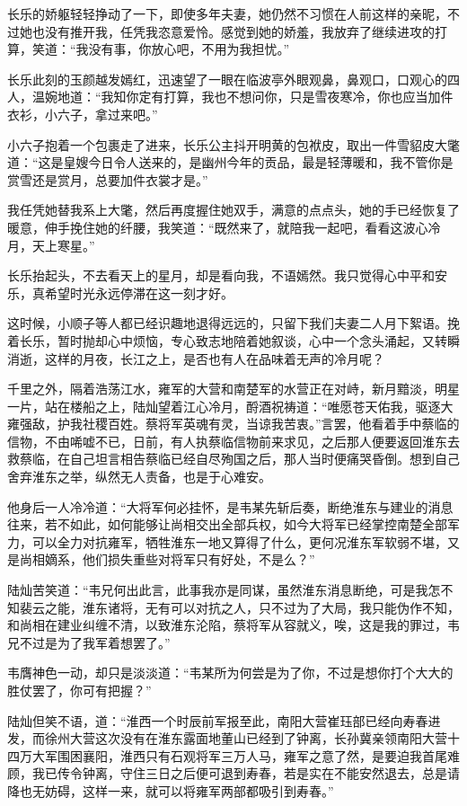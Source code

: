 长乐的娇躯轻轻挣动了一下，即使多年夫妻，她仍然不习惯在人前这样的亲昵，不过她也没有推开我，任凭我恣意爱怜。感觉到她的娇羞，我放弃了继续进攻的打算，笑道：“我没有事，你放心吧，不用为我担忧。”

长乐此刻的玉颜越发嫣红，迅速望了一眼在临波亭外眼观鼻，鼻观口，口观心的四人，温婉地道：“我知你定有打算，我也不想问你，只是雪夜寒冷，你也应当加件衣衫，小六子，拿过来吧。”

小六子抱着一个包裹走了进来，长乐公主抖开明黄的包袱皮，取出一件雪貂皮大氅道：“这是皇嫂今日令人送来的，是幽州今年的贡品，最是轻薄暖和，我不管你是赏雪还是赏月，总要加件衣裳才是。”

我任凭她替我系上大氅，然后再度握住她双手，满意的点点头，她的手已经恢复了暖意，伸手挽住她的纤腰，我笑道：“既然来了，就陪我一起吧，看看这波心冷月，天上寒星。”

长乐抬起头，不去看天上的星月，却是看向我，不语嫣然。我只觉得心中平和安乐，真希望时光永远停滞在这一刻才好。

这时候，小顺子等人都已经识趣地退得远远的，只留下我们夫妻二人月下絮语。挽着长乐，暂时抛却心中烦恼，专心致志地陪着她叙谈，心中一个念头涌起，又转瞬消逝，这样的月夜，长江之上，是否也有人在品味着无声的冷月呢？

千里之外，隔着浩荡江水，雍军的大营和南楚军的水营正在对峙，新月黯淡，明星一片，站在楼船之上，陆灿望着江心冷月，酹酒祝祷道：“唯愿苍天佑我，驱逐大雍强敌，护我社稷百姓。蔡将军英魂有灵，当谅我苦衷。”言罢，他看着手中蔡临的信物，不由唏嘘不已，日前，有人执蔡临信物前来求见，之后那人便要返回淮东去救蔡临，在自己坦言相告蔡临已经自尽殉国之后，那人当时便痛哭昏倒。想到自己舍弃淮东之举，纵然无人责备，也是于心难安。

他身后一人冷冷道：“大将军何必挂怀，是韦某先斩后奏，断绝淮东与建业的消息往来，若不如此，如何能够让尚相交出全部兵权，如今大将军已经掌控南楚全部军力，可以全力对抗雍军，牺牲淮东一地又算得了什么，更何况淮东军软弱不堪，又是尚相嫡系，他们损失重些对将军只有好处，不是么？”

陆灿苦笑道：“韦兄何出此言，此事我亦是同谋，虽然淮东消息断绝，可是我怎不知裴云之能，淮东诸将，无有可以对抗之人，只不过为了大局，我只能伪作不知，和尚相在建业纠缠不清，以致淮东沦陷，蔡将军从容就义，唉，这是我的罪过，韦兄不过是为了我军着想罢了。”

韦膺神色一动，却只是淡淡道：“韦某所为何尝是为了你，不过是想你打个大大的胜仗罢了，你可有把握？”

陆灿但笑不语，道：“淮西一个时辰前军报至此，南阳大营崔珏部已经向寿春进发，而徐州大营这次没有在淮东露面地董山已经到了钟离，长孙冀亲领南阳大营十四万大军围困襄阳，淮西只有石观将军三万人马，雍军之意了然，是要迫我首尾难顾，我已传令钟离，守住三日之后便可退到寿春，若是实在不能安然退去，总是请降也无妨碍，这样一来，就可以将雍军两部都吸引到寿春。”


